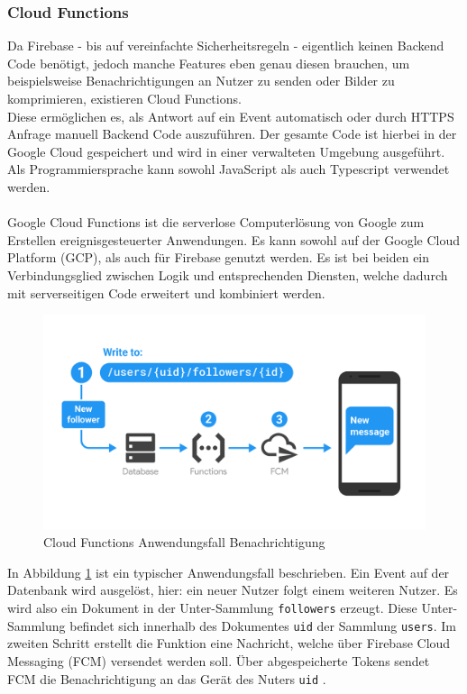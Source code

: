 \subsubsection{Cloud Functions}
\label{sec:cloudfunctions}
Da Firebase - bis auf vereinfachte Sicherheitsregeln - eigentlich keinen Backend Code benötigt, jedoch manche Features eben genau diesen brauchen, um beispielsweise Benachrichtigungen an Nutzer zu senden oder Bilder zu komprimieren, existieren Cloud Functions.\\
Diese ermöglichen es, als Antwort auf ein Event automatisch oder durch HTTPS Anfrage manuell Backend Code auszuführen.
Der gesamte Code ist hierbei in der Google Cloud gespeichert und wird in einer verwalteten Umgebung ausgeführt.
Als Programmiersprache kann sowohl JavaScript als auch Typescript verwendet werden.\\
\\
\glqq Google Cloud Functions ist die serverlose Computerlösung von Google zum Erstellen ereignisgesteuerter Anwendungen\grqq \cite{firebase2021}.
Es kann sowohl auf der Google Cloud Platform (GCP), als auch für Firebase genutzt werden. 
Es ist bei beiden ein Verbindungsglied zwischen Logik und entsprechenden Diensten, welche dadurch mit serverseitigen Code erweitert und kombiniert werden.
\begin{figure}[tbt]
	\begin{center}
		\includegraphics[scale=0.2]{Theoretische_Grundlagen/images/firebase_functions_notify.png}
	\end{center}
	\caption{Cloud Functions Anwendungsfall Benachrichtigung}
	\label{fig:functions_notifications}
\end{figure}
In Abbildung \ref{fig:functions_notifications} ist ein typischer Anwendungsfall beschrieben. 
Ein Event auf der Datenbank wird ausgelöst, hier: ein neuer Nutzer folgt einem weiteren Nutzer.
Es wird also ein Dokument in der Unter-Sammlung \texttt{followers} erzeugt. Diese Unter-Sammlung befindet sich innerhalb des Dokumentes \texttt{uid} der Sammlung \texttt{users}.
Im zweiten Schritt erstellt die Funktion eine Nachricht, welche über Firebase Cloud Messaging (FCM) versendet werden soll.
Über abgespeicherte Tokens sendet FCM die Benachrichtigung an das Gerät des Nuters \texttt{uid} \cite{firebase2021}.
